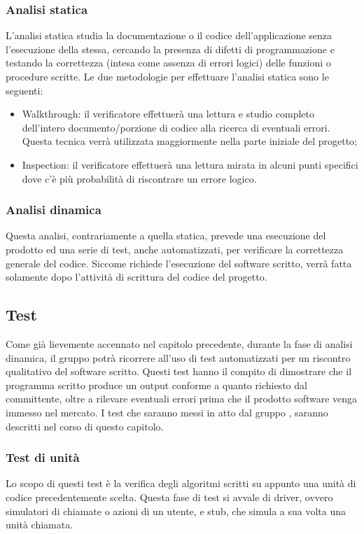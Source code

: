 \subsubsection{Analisi statica}
L’analisi statica studia la documentazione o il codice dell’applicazione senza l’esecuzione della stessa, cercando la presenza di difetti di programmazione e testando la correttezza (intesa come assenza di errori logici) delle funzioni o procedure scritte.
Le due metodologie per effettuare l’analisi statica sono le seguenti:
\begin{itemize}
	\item Walkthrough: il verificatore effettuerà una lettura e studio completo dell’intero documento/porzione di codice alla ricerca di eventuali errori. Questa tecnica verrà utilizzata maggiormente nella parte iniziale del progetto;
	\item Inspection: il verificatore effettuerà una lettura mirata in alcuni punti specifici dove c’è più probabilità di riscontrare un errore logico.
\end{itemize}

\subsubsection{Analisi dinamica}
Questa analisi, contrariamente a quella statica, prevede una esecuzione del prodotto ed una serie di test, anche automatizzati, per verificare la correttezza generale del codice. Siccome richiede l’esecuzione del software scritto, verrà fatta solamente dopo l’attività di scrittura del codice del progetto.

\subsection{Test}
Come già lievemente accennato nel capitolo precedente, durante la fase di analisi dinamica, il gruppo {\Gruppo} potrà ricorrere all’uso di test automatizzati per un riscontro qualitativo del software scritto. Questi test hanno il compito di dimostrare che il programma scritto produce un output conforme a quanto richiesto dal committente, oltre a rilevare eventuali errori prima che il prodotto software venga immesso nel mercato. I test che saranno messi in atto dal gruppo {\Gruppo}, saranno descritti nel corso di questo capitolo.

\subsubsection{Test di unità}
Lo scopo di questi test è la verifica degli algoritmi scritti su appunto una unità di codice precedentemente scelta. Questa fase di test si avvale di driver, ovvero simulatori di chiamate o azioni di un utente, e stub, che simula a sua volta una unità chiamata.

